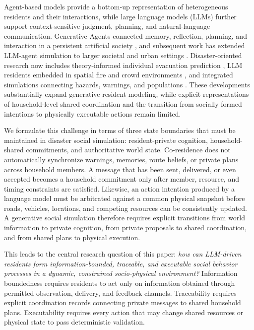 \documentclass[journal]{IEEEtran}
\begin{document}
Agent-based models provide a bottom-up representation of heterogeneous residents and their interactions, while large language models (LLMs) further support context-sensitive judgment, planning, and natural-language communication. Generative Agents connected memory, reflection, planning, and interaction in a persistent artificial society \cite{park2023generativeagents}, and subsequent work has extended LLM-agent simulation to larger societal and urban settings \cite{zhang2025agentsociety,bougie2025citysim,zhou2026gasim}. Disaster-oriented research now includes theory-informed individual evacuation prediction \cite{chen2025flare}, LLM residents embedded in spatial fire and crowd environments \cite{dang2025fireagents,yang2026whenagents}, and integrated simulations connecting hazards, warnings, and populations \cite{sultimov2026respond}. These developments substantially expand generative resident modeling, while explicit representations of household-level shared coordination and the transition from socially formed intentions to physically executable actions remain limited.

We formulate this challenge in terms of three state boundaries that must be maintained in disaster social simulation: resident-private cognition, household-shared commitments, and authoritative world state. Co-residence does not automatically synchronize warnings, memories, route beliefs, or private plans across household members. A message that has been sent, delivered, or even accepted becomes a household commitment only after member, resource, and timing constraints are satisfied. Likewise, an action intention produced by a language model must be arbitrated against a common physical snapshot before roads, vehicles, locations, and competing resources can be consistently updated. A generative social simulation therefore requires explicit transitions from world information to private cognition, from private proposals to shared coordination, and from shared plans to physical execution.

This leads to the central research question of this paper: \emph{how can LLM-driven residents form information-bounded, traceable, and executable social behavior processes in a dynamic, constrained socio-physical environment?} Information boundedness requires residents to act only on information obtained through permitted observation, delivery, and feedback channels. Traceability requires explicit coordination records connecting private messages to shared household plans. Executability requires every action that may change shared resources or physical state to pass deterministic validation.
\end{document}
